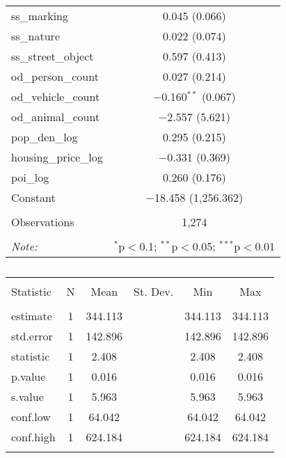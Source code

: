 \begin{table}[!htbp]
\begin{tabular}{@{\extracolsep{1pt}}lc}
  ss\_marking & 0.045 (0.066) \\ 
  ss\_nature & 0.022 (0.074) \\ 
  ss\_street\_object & 0.597 (0.413) \\ 
  od\_person\_count & 0.027 (0.214) \\ 
  od\_vehicle\_count & $-$0.160$^{**}$ (0.067) \\ 
  od\_animal\_count & $-$2.557 (5.621) \\ 
  pop\_den\_log & 0.295 (0.215) \\ 
  housing\_price\_log & $-$0.331 (0.369) \\ 
  poi\_log & 0.260 (0.176) \\ 
  Constant & $-$18.458 (1,256.362) \\ 
 \hline \\[-1.8ex] 
Observations & 1,274 \\ 
\hline 
\hline \\[-1.8ex] 
\textit{Note:}  & \multicolumn{1}{r}{$^{*}$p$<$0.1; $^{**}$p$<$0.05; $^{***}$p$<$0.01} \\ 
\end{tabular} 
\end{table} 

\begin{table}[!htbp] \centering 
  \caption{} 
  \label{} 
\small 
\begin{tabular}{@{\extracolsep{1pt}}lccccc} 
\\[-1.8ex]\hline 
\hline \\[-1.8ex] 
Statistic & \multicolumn{1}{c}{N} & \multicolumn{1}{c}{Mean} & \multicolumn{1}{c}{St. Dev.} & \multicolumn{1}{c}{Min} & \multicolumn{1}{c}{Max} \\ 
\hline \\[-1.8ex] 
estimate & 1 & 344.113 &  & 344.113 & 344.113 \\ 
std.error & 1 & 142.896 &  & 142.896 & 142.896 \\ 
statistic & 1 & 2.408 &  & 2.408 & 2.408 \\ 
p.value & 1 & 0.016 &  & 0.016 & 0.016 \\ 
s.value & 1 & 5.963 &  & 5.963 & 5.963 \\ 
conf.low & 1 & 64.042 &  & 64.042 & 64.042 \\ 
conf.high & 1 & 624.184 &  & 624.184 & 624.184 \\ 
\hline \\[-1.8ex] 
\end{tabular} 
\end{table} 

